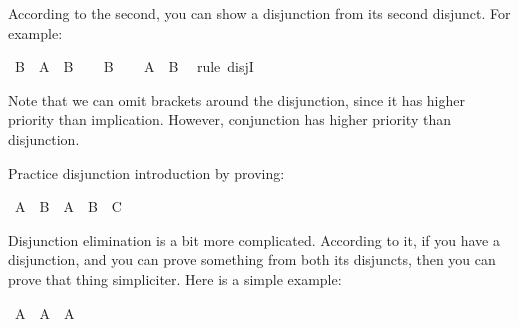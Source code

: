\begin{isabellebody}
%
\endisadelimproof
%
\begin{isamarkuptext}%
According to the second, you can show a disjunction from its second disjunct. For example:%
\end{isamarkuptext}\isamarkuptrue%
\isamarkupfalse%
\ {\isachardoublequoteopen}B\ {\isasymlongrightarrow}\ A\ {\isasymor}\ B{\isachardoublequoteclose}\isanewline
%
\isadelimproof
%
\endisadelimproof
%
\isatagproof
{}\isamarkupfalse%
\isanewline
\ \ \isamarkupfalse%
\ {\isachardoublequoteopen}B{\isachardoublequoteclose}\isanewline
\ \ \isamarkupfalse%
\ {\isachardoublequoteopen}A\ {\isasymor}\ B{\isachardoublequoteclose}\ \isamarkupfalse%
\ {\isacharparenleft}rule\ disjI{}{\isacharparenright}\isanewline
{}\isamarkupfalse%
%
\endisatagproof
{\isafoldproof}%
%
\isadelimproof
%
\endisadelimproof
%
\begin{isamarkuptext}%
Note that we can omit brackets around the disjunction, since it has higher priority than
implication. However, conjunction has higher priority than disjunction.%
\end{isamarkuptext}\isamarkuptrue%
%
\begin{isamarkuptext}%
\begin{Exercise} Practice disjunction introduction by proving: \end{Exercise}%
\end{isamarkuptext}\isamarkuptrue%
\isamarkupfalse%
\ {\isachardoublequoteopen}{\isacharparenleft}A\ {\isasymlongrightarrow}\ B{\isacharparenright}\ {\isasymlongrightarrow}\ {\isacharparenleft}A\ {\isasymlongrightarrow}\ B\ {\isasymor}\ C{\isacharparenright}{\isachardoublequoteclose}%
\isadelimproof
\ %
\endisadelimproof
%
\isatagproof
{}\isamarkupfalse%
%
\endisatagproof
{\isafoldproof}%
%
\isadelimproof
%
\endisadelimproof
%
\isamarkuptrue%
%
\begin{isamarkuptext}%
Disjunction elimination is a bit more complicated. According to it, if you have a disjunction,
and you can prove something from both its disjuncts, then you can prove that thing simpliciter.
Here is a simple example:%
\end{isamarkuptext}\isamarkuptrue%
\isamarkupfalse%
\ {\isachardoublequoteopen}A\ {\isasymor}\ A\ {\isasymlongrightarrow}\ A{\isachardoublequoteclose}\isanewline
%
\isadelimproof
%
\endisadelimproof
%
\isatagproof
{}\isamarkupfalse%

\end{isabellebody}
